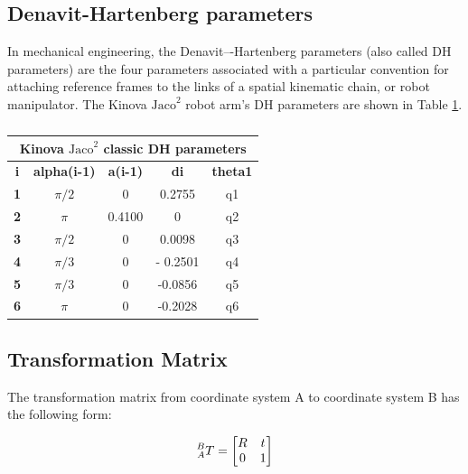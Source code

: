 \documentclass{ieeeaccess}
\begin{document}
\subsection{Denavit-Hartenberg parameters}
In mechanical engineering, the Denavit–-Hartenberg parameters \cite{denavit-1955a}(also called DH parameters) are the four parameters associated with a particular convention for attaching reference frames to the links of a spatial kinematic chain, or robot manipulator.
The Kinova $\text{Jaco}^2$ robot arm's DH parameters are shown in Table \ref{dh_parameters}.
\begin{table}[!t]
	\centering 
	\caption{}
	\begin{tabular}{ccccc}
		\toprule
		\multicolumn{5}{c}{Kinova $\text{Jaco}^2$ classic DH parameters}\\ 
		\midrule
		\textbf{i}&\textbf{alpha(i-1)}&\textbf{a(i-1)}&\textbf{di}& \textbf{theta1}\\
		\midrule
		\textbf{1}&${\pi}/{2}$&0&0.2755&q1\\
		\midrule
		\textbf{2}&$\pi$&0.4100&0&q2\\
		\midrule
		\textbf{3}&${\pi}/{2}$&0&0.0098&q3\\
		\midrule
		\textbf{4}&${\pi}/{3}$&0&- 0.2501&q4\\
		\midrule
		\textbf{5}&${\pi}/{3}$&0&-0.0856&q5\\
		\midrule
		\textbf{6}&$\pi$&0&-0.2028&q6\\
		\bottomrule
	\end{tabular}
	\label{dh_parameters}
\end{table}


\subsection{Transformation Matrix}
The transformation matrix from coordinate system A to coordinate system B has the following form:

\begin{equation}
\prescript{B}{A}T = 
\left[
\begin{matrix}
R  & t  \\
0 & 1
\end{matrix}
\right] 
\label{TransMat}
\end{equation}
\end{document}
